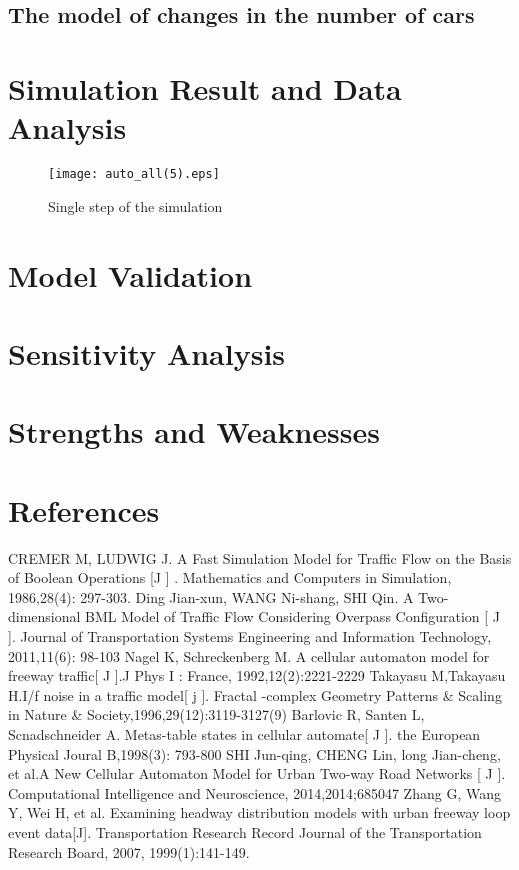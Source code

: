 \documentclass{mcmthesis}
\begin{document}
\subsection{The model of changes in the number of cars}
\label{changes of cars}
 
\section{Simulation Result and Data Analysis}
\begin{figure}[H]
	\centerline{\texttt{[image: auto\_all(5).eps]}}
	\caption{Single step of the simulation}
\end{figure}
\section{Model Validation}

\section{Sensitivity Analysis}

\section{Strengths and Weaknesses}



\section{References}
\begin{thebibliography}{99}
CREMER M, LUDWIG J. A Fast Simulation Model for Traffic Flow on the Basis of Boolean Operations [J ] . Mathematics and Computers in Simulation, 1986,28(4): 297-303.
Ding Jian-xun, WANG Ni-shang, SHI Qin. A Two-dimensional BML Model of Traffic Flow Considering Overpass Configuration [ J ]. Journal of Transportation Systems Engineering and Information Technology, 2011,11(6): 98-103
Nagel K, Schreckenberg M. A cellular automaton model for freeway traffic[ J ].J Phys I : France, 1992,12(2):2221-2229
Takayasu M,Takayasu H.I/f  noise in a traffic model[ j ]. Fractal -complex Geometry Patterns \& Scaling in Nature \& Society,1996,29(12):3119-3127(9)
Barlovic R, Santen L, Scnadschneider A. Metas-table states in cellular automate[ J ]. the European Physical Joural B,1998(3): 793-800
SHI Jun-qing, CHENG Lin, long Jian-cheng, et al.A New Cellular Automaton Model for Urban Two-way Road Networks [ J ]. Computational Intelligence and Neuroscience, 2014,2014;685047
Zhang G, Wang Y, Wei H, et al. Examining headway distribution models with urban freeway loop event data[J]. Transportation Research Record Journal of the Transportation Research Board, 2007, 1999(1):141-149.
\end{thebibliography}
\end{document}
